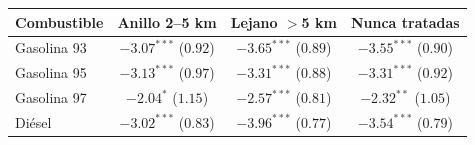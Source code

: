 \begin{tabular}{lccc}
\toprule
Combustible & Anillo 2--5 km & Lejano $>$5 km & Nunca tratadas \\
\midrule
Gasolina 93 & $-3.07^{***}$ ($0.92$) & $-3.65^{***}$ ($0.89$) & $-3.55^{***}$ ($0.90$) \\
Gasolina 95 & $-3.13^{***}$ ($0.97$) & $-3.31^{***}$ ($0.88$) & $-3.31^{***}$ ($0.92$) \\
Gasolina 97 & $-2.04^{*}$ ($1.15$) & $-2.57^{***}$ ($0.81$) & $-2.32^{**}$ ($1.05$) \\
Diésel & $-3.02^{***}$ ($0.83$) & $-3.96^{***}$ ($0.77$) & $-3.54^{***}$ ($0.79$) \\
\bottomrule
\end{tabular}
